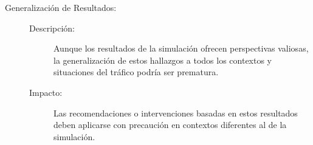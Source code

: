 \begin{description}
    \item[Generalización de Resultados:] \phantom{-}
    \begin{description}
        \item[Descripción:] Aunque los resultados de la simulación ofrecen perspectivas valiosas, la generalización de estos hallazgos a todos los contextos y situaciones del tráfico podría ser prematura.
        \item[Impacto:] Las recomendaciones o intervenciones basadas en estos resultados deben aplicarse con precaución en contextos diferentes al de la simulación.
    \end{description}
\end{description}

